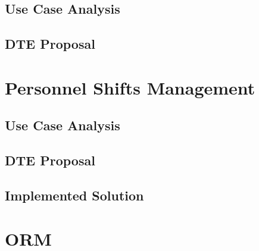 \documentclass[12pt,a4paper,openright,twoside]{book}
\begin{document}
\section{Use Case Analysis}

\section{\acl{DTE} Proposal}



\chapter{Personnel Shifts Management}
\label{chap:personnel-shifts-management}

\section{Use Case Analysis}

\section{\acl{DTE} Proposal}

\section{Implemented Solution}



\chapter{\acl{ORM}}
\label{chap:orm}

\end{document}
